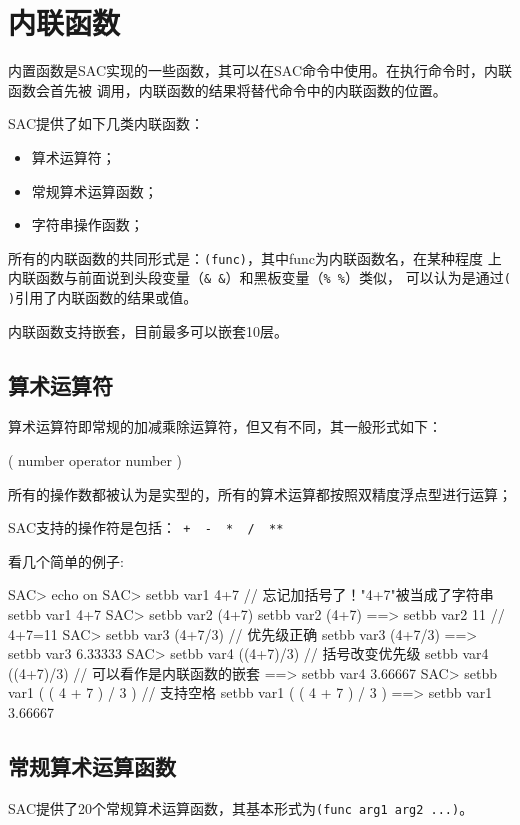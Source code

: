 \section{内联函数}

内置函数是SAC实现的一些函数，其可以在SAC命令中使用。在执行命令时，内联函数会首先被
调用，内联函数的结果将替代命令中的内联函数的位置。

SAC提供了如下几类内联函数：
\begin{itemize}
\item 算术运算符；
\item 常规算术运算函数；
\item 字符串操作函数；
\end{itemize}

所有的内联函数的共同形式是：\lstinline{(func)}，其中func为内联函数名，在某种程度
上内联函数与前面说到头段变量（\lstinline{& &}）和黑板变量（\lstinline{% %}）类似，
可以认为是通过\lstinline{( )}引用了内联函数的结果或值。

内联函数支持嵌套，目前最多可以嵌套10层。

\subsection{算术运算符}
算术运算符即常规的加减乘除运算符，但又有不同，其一般形式如下：
\begin{SACCode}
    ( number operator number ) 
\end{SACCode}
所有的操作数都被认为是实型的，所有的算术运算都按照双精度浮点型进行运算；

SAC支持的操作符是包括：\lstinline{ +  -  *  /  ** }

看几个简单的例子:
\begin{SACCode}
SAC> echo on                
SAC> setbb var1 4+7             // 忘记加括号了！"4+7"被当成了字符串
 setbb var1 4+7
SAC> setbb var2 (4+7)           
 setbb var2 (4+7)
 ==>  setbb var2 11             // 4+7=11
SAC> setbb var3 (4+7/3)         // 优先级正确
 setbb var3 (4+7/3)
 ==>  setbb var3 6.33333
SAC> setbb var4 ((4+7)/3)       // 括号改变优先级
 setbb var4 ((4+7)/3)           // 可以看作是内联函数的嵌套
 ==>  setbb var4 3.66667
SAC> setbb var1 ( ( 4 + 7 ) / 3 )   // 支持空格
 setbb var1 ( ( 4 + 7 ) / 3 )
 ==>  setbb var1 3.66667
\end{SACCode}

\subsection{常规算术运算函数}
SAC提供了20个常规算术运算函数，其基本形式为\lstinline{(func arg1 arg2 ...)}。

